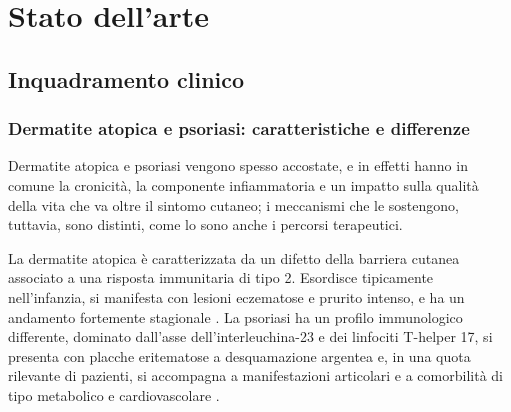 \chapter{Stato dell'arte}\label{ch:stato-arte}

\section{Inquadramento clinico}\label{sec:inquadramento-clinico}

\subsection{Dermatite atopica e psoriasi: caratteristiche e differenze}\label{subsec:dermatite-psoriasi}

Dermatite atopica e psoriasi vengono spesso accostate, e in effetti hanno in comune la cronicità, la componente infiammatoria e
un impatto sulla qualità della vita che va oltre il sintomo cutaneo; i meccanismi che le sostengono, tuttavia, sono distinti, come
lo sono anche i percorsi terapeutici.

La dermatite atopica è caratterizzata da un difetto della barriera cutanea associato a una risposta immunitaria di tipo 2.
Esordisce tipicamente nell'infanzia, si manifesta con lesioni eczematose e prurito intenso, e ha un andamento fortemente stagionale \cite{weidingerAD}.
La psoriasi ha un profilo immunologico differente, dominato dall'asse dell'interleuchina-23 e dei linfociti T-helper 17, si presenta
con placche eritematose a desquamazione argentea e, in una quota rilevante di pazienti, si accompagna a manifestazioni articolari
e a comorbilità di tipo metabolico e cardiovascolare \cite{griffithsPsoriasis}.


